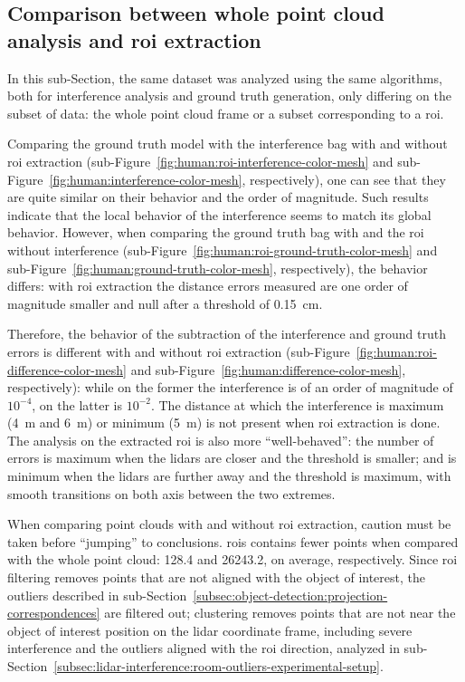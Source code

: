 \subsection{Comparison between whole point cloud analysis and \acs{roi} extraction}
In this sub-Section, the same dataset was analyzed using the same algorithms, both for interference analysis and ground truth generation, only differing on the subset of data: the whole point cloud frame or a subset corresponding to a \ac{roi}.

Comparing the ground truth model with the interference bag with and without \ac{roi} extraction (sub-Figure~\ref{fig:human:roi-interference-color-mesh} and sub-Figure~\ref{fig:human:interference-color-mesh}, respectively), one can see that they are quite similar on their behavior and the order of magnitude. Such results indicate that the local behavior of the interference seems to match its global behavior. However, when comparing the ground truth bag with and the \ac{roi} without interference (sub-Figure~\ref{fig:human:roi-ground-truth-color-mesh} and sub-Figure~\ref{fig:human:ground-truth-color-mesh}, respectively), the behavior differs: with \ac{roi} extraction the distance errors measured are one order of magnitude smaller and null after a threshold of \SI{0.15}{\centi\meter}. 

Therefore, the behavior of the subtraction of the interference and ground truth errors is different with and without \ac{roi} extraction (sub-Figure~\ref{fig:human:roi-difference-color-mesh} and sub-Figure~\ref{fig:human:difference-color-mesh}, respectively): while on the former the interference is of an order of magnitude of $10^{-4}$, on the latter is $10^{-2}$. The distance at which the interference is maximum (\SI{4}{\meter} and \SI{6}{\meter}) or minimum (\SI{5}{\meter}) is not present when \ac{roi} extraction is done. The analysis on the extracted \ac{roi} is also more ``well-behaved'': the number of errors is maximum when the \acp{lidar} are closer and the threshold is smaller; and is minimum when the \acp{lidar} are further away and the threshold is maximum, with smooth transitions on both axis between the two extremes.

When comparing point clouds with and without \ac{roi} extraction, caution must be taken before  ``jumping'' to conclusions. \acp{roi} contains fewer points when compared with the whole point cloud: 128.4 and 26243.2, on average, respectively. Since \ac{roi} filtering removes points that are not aligned with the object of interest, the outliers described in sub-Section~\ref{subsec:object-detection:projection-correspondences} are filtered out; clustering removes points that are not near the object of interest position on the \ac{lidar} coordinate frame, including severe interference and the outliers aligned with the \ac{roi} direction, analyzed in sub-Section~\ref{subsec:lidar-interference:room-outliers-experimental-setup}.

